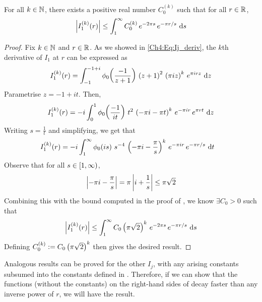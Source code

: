 \begin{boxlemma}\label{Ch4:Lemma:Reducing_higher_deriv_Schwartzness_I_1}
    For all $k \in \mathbb{N}$, there exists a positive real number $C_0^{(k)}$ such that for all $r \in \mathbb{R}$,
    \begin{align*}
        \left\lvert I_1^{(k)}\!\left( r \right) \right\rvert \leq \int_{1}^{\infty} C_0^{(k)} \, e^{-2\pi s} \, e^{- \pi r / s} \, \operatorname{d}\!{s}
    \end{align*}
\end{boxlemma}
\begin{proof}
    Fix $k \in \mathbb{N}$ and $r \in \mathbb{R}$. As we showed in \eqref{Ch4:Eq:Ij_deriv}, the $k$th derivative of $I_1$ at $r$ can be expressed as
    \begin{align*}
        I_1^{(k)}\!\left( r \right) = \int_{-1}^{-1+i} \phi_0\!\left( \frac{-1}{z+1} \right) \, \left( z+1 \right)^2 \, \left( \pi i z \right)^k \, e^{\pi i r z} \, \operatorname{d}\!{z}
    \end{align*}
    Parametrise $z = -1 + it$. Then,
    \begin{align*}
        I_1^{(k)}\!\left( r \right) = -i \int_{0}^{1} \phi_0\!\left( \frac{-1}{it} \right) \, t^2 \, \left( -\pi i - \pi t \right)^k \, e^{-\pi i r} \, e^{\pi r t} \, \operatorname{d}\!{z}
    \end{align*}
    Writing $s = \frac{1}{t}$ and simplifying, we get that
    \begin{align*}
        I_1^{(k)}\!\left( r \right) &= -i \int_{1}^{\infty}
            \phi_0\!\left( is \right) \,
            s^{-4} \,
            \left( -\pi i - \frac{\pi}{s} \right)^k \,
            e^{-\pi i r} \,
            e^{-\pi r / s}\,
            \operatorname{d}\!{t}
    \end{align*}
    Observe that for all $s \in \left[1, \infty\right)$,
    \begin{align*}
        \left\lvert -\pi i - \frac{\pi}{s} \right\rvert = \pi \left\lvert i + \frac{1}{s} \right\rvert \leq \pi \sqrt{2}
    \end{align*}
    Combining this with the bound computed in the proof of , we know $\exists C_0 > 0$ such that
    \begin{align*}
        \left\lvert I_1^{(k)}\!\left( r \right) \right\rvert \leq \int_{1}^{\infty} C_0 \left( \pi \sqrt{2} \right)^{k} \, e^{-2\pi s} \, e^{- \pi r / s} \, \operatorname{d}\!{s}
    \end{align*}
    Defining $C_0^{(k)} := C_0 \left( \pi \sqrt{2} \right)^{k}$ then gives the desired result.
\end{proof}

Analogous results can be proved for the other $I_j$, with any arising constants subsumed into the constants defined in . Therefore, if we can show that the functions (without the constants) on the right-hand sides of  decay faster than any inverse power of $r$, we will have the result.

